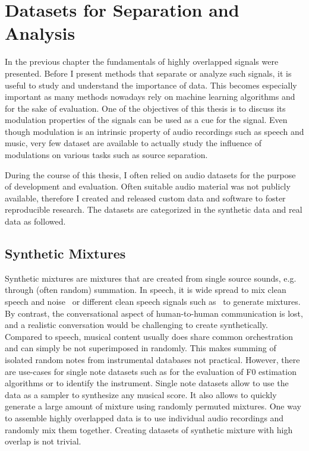 \chapter{Datasets for Separation and Analysis}
\label{cha:datasets}
In the previous chapter the fundamentals of highly overlapped signals were presented.
Before I present methods that separate or analyze such signals, it is useful to study and understand the importance of data.
This becomes especially important as many methods nowadays rely on machine learning algorithms and for the sake of evaluation.
One of the objectives of this thesis is to discuss its modulation properties of the signals can be used as a cue for the signal.
Even though modulation is an intrinsic property of audio recordings such as speech and music, very few dataset are available to actually study the influence of modulations on various tasks such as source separation.
\par
During the course of this thesis, I often relied on audio datasets for the purpose of development and evaluation.
Often suitable audio material was not publicly available, therefore I created and released custom data and software to foster reproducible research.
The datasets are categorized in the synthetic data and real data as followed.

\section{Synthetic Mixtures}

Synthetic mixtures are mixtures that are created from single source sounds, e.g. through (often random) summation. 
In speech, it is wide spread to mix clean speech and noise~\cite{varga93} or different clean speech signals such as~\cite{garofolo93} to generate mixtures.
By contrast, the conversational aspect of human-to-human communication is lost, and a realistic  conversation would be challenging to create synthetically.
Compared to speech, musical content usually does share common orchestration and can simply be not superimposed in randomly. 
This makes summing of isolated random notes from instrumental databases not practical.
However, there are use-cases for single note datasets such as for the evaluation of F0 estimation algorithms or to identify the instrument.
Single note datasets allow to use the data as a sampler to synthesize any musical score.
It also allows to quickly generate a large amount of mixture using randomly permuted mixtures.
One way to assemble highly overlapped data is to use individual audio recordings and randomly mix them together.
Creating datasets of synthetic mixture with high overlap is not trivial.

